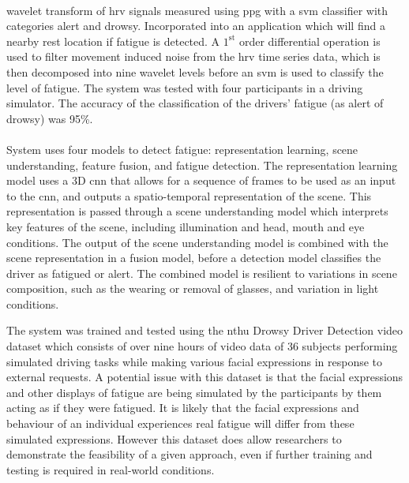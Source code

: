 \documentclass[11pt, parskip=half*,twoside=false]{scrbook}
\begin{document}
\paragraph{\citet{liDetectionDriverDrowsiness2013}} wavelet transform of \gls{hrv} signals measured using \gls{ppg} with a \gls{svm} classifier with categories alert and drowsy. Incorporated into an application which will find a nearby rest location if fatigue is detected. A $1^\text{st}$ order differential operation is used to filter movement induced noise from the  \gls{hrv} time series data, which is then decomposed into nine wavelet levels before an \gls{svm} is used to classify the level of fatigue. The system was tested with four participants in a driving simulator. The accuracy of the classification of the drivers' fatigue (as alert of drowsy) was 95\%.

\paragraph{\citet{yuDriverDrowsinessDetection2019}} System uses four models to detect fatigue: representation learning, scene understanding, feature fusion, and fatigue detection. The representation learning model uses a 3D \gls{cnn} that allows for a sequence of frames to be used as an input to the \gls{cnn}, and outputs a spatio-temporal representation of the scene. This representation is passed through a scene understanding model which interprets key features of the scene, including illumination and head, mouth and eye conditions. The output of the scene understanding model is combined with the scene representation in a fusion model, before a detection model classifies the driver as fatigued or alert. The combined model is resilient to variations in scene composition, such as the wearing or removal of glasses, and variation in light conditions. 
 
The system was trained and tested using the \gls{nthu} Drowsy Driver Detection video dataset \citep{wengDriverDrowsinessDetection2017} which consists of over nine hours of video data of 36 subjects performing simulated driving tasks while making various facial expressions in response to external requests. A potential issue with this dataset is that the facial expressions and other displays of fatigue are being simulated by the participants by them acting as if they were fatigued. It is likely that the facial expressions and behaviour of an individual experiences real fatigue will differ from these simulated expressions. However this dataset does allow researchers to demonstrate the feasibility of a given approach, even if further training and testing is required in real-world conditions.
\end{document}
